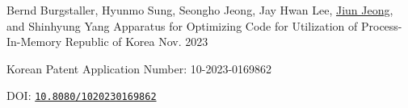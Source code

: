 

\begin{cventries}

  \cventry
    {Bernd Burgstaller, Hyunmo Sung, Seongho Jeong, Jay Hwan Lee, \underline{Jiun Jeong}, and Shinhyung Yang} %
    {Apparatus for Optimizing Code for Utilization of Process-In-Memory} %
    {Republic of Korea} %
    {Nov. 2023} %
    {
      \begin{cvitems} %
        \item {Korean Patent Application Number: 10-2023-0169862}
        \item {DOI: \href{https://doi.org/10.8080/1020230169862}{\texttt{10.8080/1020230169862}}}
      \end{cvitems}
    }

\end{cventries}
